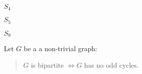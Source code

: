 \documentclass[letterpaper,12pt,fleqn]{article}
\begin{document}
\begin{examples}
\begin{minipage}{1.25in}
\begin{center}
      \bigskip

      \(S_4\)
    \end{center}
  \end{minipage}
  \begin{minipage}{1.25in}
    \begin{center}

      \bigskip

      \(S_5\)
    \end{center}
  \end{minipage}
  \begin{minipage}{1.25in}
    \begin{center}

      \bigskip

      \(S_9\)
    \end{center}
  \end{minipage}
\end{examples}

\begin{theorem}
  Let \(G\) be a a non-trivial graph:
  \begin{quote}
    \(G\) is bipartite \(\iff G\) has no odd cycles.
  \end{quote}
\end{theorem}
\end{document}
